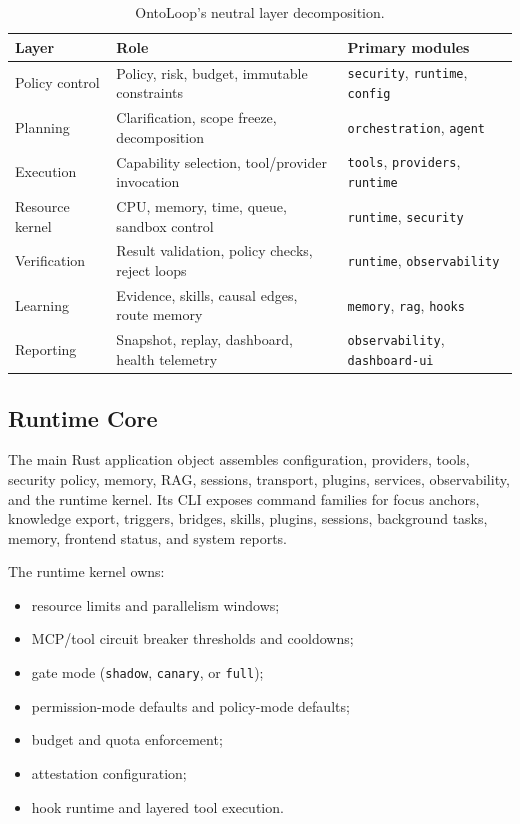 \documentclass[11pt]{article}
\begin{document}
\begin{table}[h]
\centering
\begin{tabular}{lll}
\toprule
Layer & Role & Primary modules \\
\midrule
Policy control & Policy, risk, budget, immutable constraints & \texttt{security}, \texttt{runtime}, \texttt{config} \\
Planning & Clarification, scope freeze, decomposition & \texttt{orchestration}, \texttt{agent} \\
Execution & Capability selection, tool/provider invocation & \texttt{tools}, \texttt{providers}, \texttt{runtime} \\
Resource kernel & CPU, memory, time, queue, sandbox control & \texttt{runtime}, \texttt{security} \\
Verification & Result validation, policy checks, reject loops & \texttt{runtime}, \texttt{observability} \\
Learning & Evidence, skills, causal edges, route memory & \texttt{memory}, \texttt{rag}, \texttt{hooks} \\
Reporting & Snapshot, replay, dashboard, health telemetry & \texttt{observability}, \texttt{dashboard-ui} \\
\bottomrule
\end{tabular}
\caption{OntoLoop's neutral layer decomposition.}
\label{tab:layers}
\end{table}

\subsection{Runtime Core}

The main Rust application object assembles configuration, providers, tools,
security policy, memory, RAG, sessions, transport, plugins, services, observability,
and the runtime kernel. Its CLI exposes command families for focus anchors,
knowledge export, triggers, bridges, skills, plugins, sessions, background tasks,
memory, frontend status, and system reports.

The runtime kernel owns:

\begin{itemize}
  \item resource limits and parallelism windows;
  \item MCP/tool circuit breaker thresholds and cooldowns;
  \item gate mode (\texttt{shadow}, \texttt{canary}, or \texttt{full});
  \item permission-mode defaults and policy-mode defaults;
  \item budget and quota enforcement;
  \item attestation configuration;
  \item hook runtime and layered tool execution.
\end{itemize}
\end{document}
